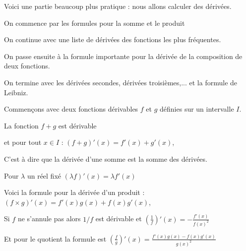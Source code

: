 







\debuttexte

\diapo

\change

Voici une partie beaucoup plus pratique : nous allons calculer
des dérivées.  

\change

On commence par les formules pour la somme et le produit

\change

On continue avec une liste de dérivées des fonctions les plus fréquentes.

\change

On passe ensuite à la formule importante pour la dérivée de la composition de deux fonctions.

\change

On termine avec les dérivées secondes, dérivées troisièmes,... et la formule de Leibniz.


\diapo
Commençons avec deux fonctions dérivables $f$ et $g$ définies sur un intervalle $I$.

\change
La fonction $f+g$ est dérivable

et pour tout $x \in I$ :
$(f+g)'(x) = f'(x)+g'(x)$,

C'est à dire que la dérivée d'une somme est la somme des dérivées.

\change

Pour $\lambda$ un réel fixé  $(\lambda f)'(x) = \lambda f'(x)$

\change

Voici la formule pour la dérivée d'un produit :
$(f \times g)'(x) = f'(x)g(x)+f(x)g'(x)$,


\change

Si $f$ ne s'annule pas  alors $1/f$ est dérivable et
  $\left(\frac{1}{f}\right)'(x)=-\frac{f'(x)}{f(x)^2}$

\change 

Et pour le quotient la formule est 
$\left(\frac{f}{g}\right)'(x)=\frac{f'(x)g(x)-f(x)g'(x)}{g(x)^2}$


\diapo

